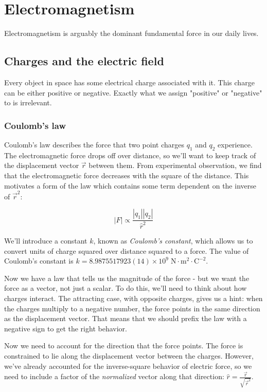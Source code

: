 \chapter{Electromagnetism}

Electromagnetism is arguably the dominant fundamental force in our daily lives.

\section{Charges and the electric field}

Every object in space has some electrical charge associated with it. This charge can be either
positive or negative. Exactly what we assign "positive" or "negative" to is irrelevant.

\subsection{Coulomb's law}

Coulomb's law describes the force that two point charges $q_1$ and $q_2$ experience. The
electromagnetic force drops off over distance, so we'll want to keep track of the displacement 
vector $\vec{r}$ between them. From experimental observation, we find that the electromagnetic
force decreases with the square of the distance. This motivates a form of the law which contains
some term dependent on the inverse of $\vec{r}^2$:

$$\left|F\right| \propto \frac{\left|q_1\right|\left|q_2\right|}{\hat{r}^2}$$

We'll introduce a constant $k$, known as \textit{Coulomb's constant}, which allows us to convert
units of charge squared over distance squared to a force. The value of Coulomb's constant is $k =
8.9875517923(14) \times 10^9 \; \mathrm{ N \cdot m^2 \cdot C^{-2}}$.

Now we have a law that tells us the magnitude of the force - but we want the force as a vector, not
just a scalar. To do this, we'll need to think about how charges interact. The attracting case, 
with opposite charges, gives us a hint: when the charges multiply to a negative number, the force
points in the same direction as the displacement vector. That means that we should prefix the law
with a negative sign to get the right behavior.

Now we need to account for the direction that the force points. The force is constrained to lie 
along the displacement vector between the charges. However, we've already accounted for the 
inverse-square behavior of electric force, so we need to include a factor of the 
\textit{normalized} vector along that direction: $\hat{r} = \frac{\vec{r}}{\sqrt{\vec{r}^2}}$.

